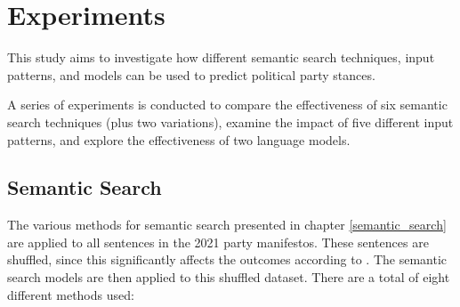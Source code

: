 \chapter{Experiments}\label{experiments}

This study aims to investigate how different semantic search techniques, input patterns, and models can be used to predict political party stances.

A series of experiments is conducted to compare the effectiveness of six semantic search techniques (plus two variations), examine the impact of five different input patterns, and explore the effectiveness of two language models.

 
\section{Semantic Search}

The various methods for semantic search presented in chapter \ref{semantic_search} are applied to all sentences in the 2021 party manifestos. These sentences are shuffled, since this significantly affects the outcomes according to \citet{li2020bertflow}. The semantic search models are then applied to this shuffled dataset. There are a total of eight different methods used:

